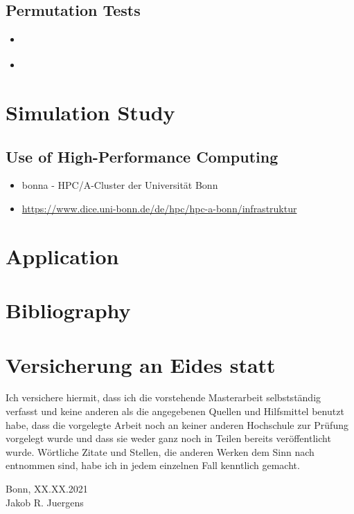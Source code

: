 \documentclass[11pt,twoside,a4paper]{article}
\begin{document}
		\subsection{Permutation Tests}
			\begin{itemize}
				\item \cite{lehmann_testing_2005}
				\item \cite{van_der_vaart_weak_1996}
			\end{itemize}
		
	\section{Simulation Study}
	
		\subsection{Use of High-Performance Computing}
			\begin{itemize}
				\item bonna - HPC/A-Cluster der Universität Bonn
				\item \url{https://www.dice.uni-bonn.de/de/hpc/hpc-a-bonn/infrastruktur}
			\end{itemize}
	
	\section{Application}
	
	\newpage
	\section{Bibliography}
	\printbibliography[heading=none]
	
	\newpage
	
	\section{Versicherung an Eides statt}	
	
		\vspace{3cm}
		
		Ich versichere hiermit, dass ich die vorstehende Masterarbeit
		selbstständig verfasst und keine anderen als die angegebenen Quellen
		und Hilfsmittel benutzt habe, dass die vorgelegte Arbeit noch an keiner
		anderen Hochschule zur Prüfung vorgelegt wurde und dass sie weder
		ganz noch in Teilen bereits veröffentlicht wurde. Wörtliche Zitate und
		Stellen, die anderen Werken dem Sinn nach entnommen sind, habe ich
		in jedem einzelnen Fall kenntlich gemacht.
		
		\vspace{2cm}
		Bonn, XX.XX.2021 \hrulefill \\
		\hspace*{0mm}Jakob R. Juergens
		
		\vspace{\fill}
\end{document}

